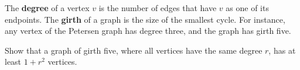 \documentclass[kulak]{tplt}
\theoremstyle{definition}
\begin{document}
\begin{enumerate}
The \textbf{degree} of a vertex $v$ is the number of edges that have $v$ as one of its endpoints.
The \textbf{girth} of a graph is the size of the smallest cycle.
For instance, any vertex of the Petersen graph has degree three, and the graph has girth five.

Show that a graph of girth five, where all vertices have the same degree $r$, has at least $1+r^2$ vertices.

\end{enumerate}
\end{document}
